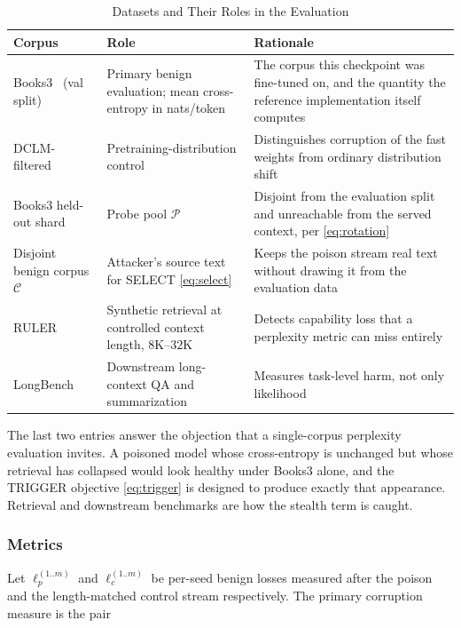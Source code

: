 \documentclass[journal]{IEEEtran}
\begin{document}
\begin{table}[!t]
\renewcommand{\arraystretch}{1.25}
\caption{Datasets and Their Roles in the Evaluation}
\label{tab:data}
\centering
\footnotesize
\begin{tabular}{|p{}|p{}|p{}|}
\hline
\textbf{Corpus} & \textbf{Role} & \textbf{Rationale} \\
\hline
Books3~\cite{gao2021pile} (val split) & Primary benign evaluation; mean
cross-entropy in nats/token & The corpus this checkpoint was fine-tuned on, and the
quantity the reference implementation itself computes \\
\hline
DCLM-filtered~\cite{li2024dclm} & Pretraining-distribution control &
Distinguishes corruption of the fast weights from ordinary distribution shift \\
\hline
Books3 held-out shard & Probe pool $\mathcal{P}$ & Disjoint from the evaluation split
and unreachable from the served context, per \eqref{eq:rotation} \\
\hline
Disjoint benign corpus $\mathcal{C}$ & Attacker's source text for SELECT
\eqref{eq:select} & Keeps the poison stream real text without drawing it from the
evaluation data \\
\hline
RULER~\cite{hsieh2024ruler} & Synthetic retrieval at controlled context length,
$8$K--$32$K & Detects capability loss that a perplexity metric can miss entirely \\
\hline
LongBench~\cite{bai2024longbench} & Downstream long-context QA and summarization &
Measures task-level harm, not only likelihood \\
\hline
\end{tabular}
\end{table}

The last two entries answer the objection that a single-corpus perplexity evaluation
invites. A poisoned model whose cross-entropy is unchanged but whose retrieval has
collapsed would look healthy under Books3 alone, and the TRIGGER objective
\eqref{eq:trigger} is designed to produce exactly that appearance. Retrieval and
downstream benchmarks are how the stealth term is caught.

\subsubsection{Metrics}
Let $\ell_p^{(1..m)}$ and $\ell_c^{(1..m)}$ be per-seed benign losses measured after
the poison and the length-matched control stream respectively. The primary corruption
measure is the pair
\end{document}
